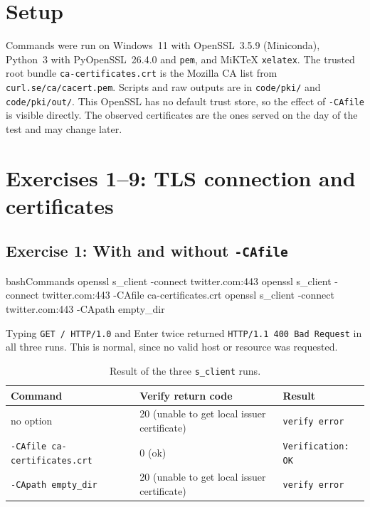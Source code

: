     \section{Setup}

        Commands were run on Windows~11 with OpenSSL~3.5.9 (Miniconda), Python~3 with
        PyOpenSSL~26.4.0 and \texttt{pem}, and MiKTeX \texttt{xelatex}. The trusted root
        bundle \texttt{ca-certificates.crt} is the Mozilla CA list from
        \texttt{curl.se/ca/cacert.pem}. Scripts and raw outputs are in
        \texttt{code/pki/} and \texttt{code/pki/out/}. This OpenSSL has no default
        trust store, so the effect of \texttt{-CAfile} is visible directly. The observed
        certificates are the ones served on the day of the test and may change later.

    \section{Exercises 1--9: TLS connection and certificates}

        \subsection{Exercise 1: With and without \texttt{-CAfile}}

            \begin{codeblock}[]{bash}{Commands}
                openssl s_client -connect twitter.com:443
                openssl s_client -connect twitter.com:443 -CAfile ca-certificates.crt
                openssl s_client -connect twitter.com:443 -CApath empty_dir
            \end{codeblock}

            Typing \texttt{GET / HTTP/1.0} and Enter twice returned \texttt{HTTP/1.1 400 Bad Request}
            in all three runs. This is normal, since no valid host or resource was requested.

            \begin{table}[h]
                \centering
                \small
                \begin{tabular}{p{}p{}p{}}
                    \toprule
                    Command & Verify return code & Result \\
                    \midrule
                    no option & 20 (unable to get local issuer certificate) & \texttt{verify error} \\
                    \texttt{-CAfile ca-certificates.crt} & 0 (ok) & \texttt{Verification: OK} \\
                    \texttt{-CApath empty\_dir} & 20 (unable to get local issuer certificate) & \texttt{verify error} \\
                    \bottomrule
                \end{tabular}
                \caption{Result of the three \texttt{s\_client} runs.}
            \end{table}

